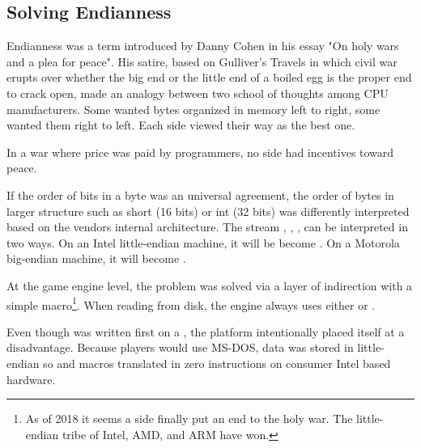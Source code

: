 \subsection{Solving Endianness}
Endianness was a term introduced by Danny Cohen in his essay "On holy wars and a plea for peace". His satire, based on Gulliver's Travels in which civil war erupts over whether the big end or the little end of a boiled egg is the proper end to crack open, made an analogy between two school of thoughts among CPU manufacturers. Some wanted bytes organized in memory left to right, some wanted them right to left. Each side viewed their way as the best one.\\
\par
In a war where price was paid by programmers, no side had incentives toward peace.



If the order of bits in a byte was an universal agreement, the order of bytes in larger structure such as short (16 bits) or int (32 bits) was differently interpreted based on the vendors internal architecture. The stream , , ,  can be interpreted in two ways. On an Intel little-endian machine, it will be become . On a Motorola big-endian machine, it will become .\\
\par
{}
\par
At the game engine level, the problem was solved via a layer of indirection with a simple macro\footnote{As of 2018 it seems a side finally put an end to the holy war. The little-endian tribe of Intel, AMD, and ARM have won.}. When reading from disk, the engine always uses either  or .\\
\par
{}
\par
{}
\par
Even though \doom{} was written first on a \NeXT, the platform intentionally placed itself at a disadvantage. Because players would use MS-DOS, data was stored in little-endian so  and  macros translated in zero instructions on consumer Intel based hardware.


